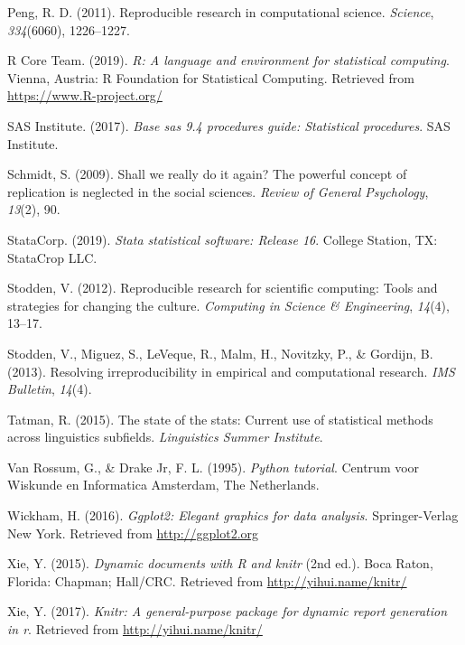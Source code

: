\documentclass[
  english,
  ,man]{apa6}
\begin{document}
\leavevmode\hypertarget{ref-peng2011}{}%
Peng, R. D. (2011). Reproducible research in computational science. \emph{Science}, \emph{334}(6060), 1226--1227.

\leavevmode\hypertarget{ref-rpro}{}%
R Core Team. (2019). \emph{R: A language and environment for statistical computing}. Vienna, Austria: R Foundation for Statistical Computing. Retrieved from \url{https://www.R-project.org/}

\leavevmode\hypertarget{ref-sas2017base}{}%
SAS Institute. (2017). \emph{Base sas 9.4 procedures guide: Statistical procedures}. SAS Institute.

\leavevmode\hypertarget{ref-schmidt2009}{}%
Schmidt, S. (2009). Shall we really do it again? The powerful concept of replication is neglected in the social sciences. \emph{Review of General Psychology}, \emph{13}(2), 90.

\leavevmode\hypertarget{ref-stata}{}%
StataCorp. (2019). \emph{Stata statistical software: Release 16}. College Station, TX: StataCrop LLC.

\leavevmode\hypertarget{ref-stodden2012}{}%
Stodden, V. (2012). Reproducible research for scientific computing: Tools and strategies for changing the culture. \emph{Computing in Science \& Engineering}, \emph{14}(4), 13--17.

\leavevmode\hypertarget{ref-stodden2013}{}%
Stodden, V., Miguez, S., LeVeque, R., Malm, H., Novitzky, P., \& Gordijn, B. (2013). Resolving irreproducibility in empirical and computational research. \emph{IMS Bulletin}, \emph{14}(4).

\leavevmode\hypertarget{ref-tatman2015}{}%
Tatman, R. (2015). The state of the stats: Current use of statistical methods across linguistics subfields. \emph{Linguistics Summer Institute}.

\leavevmode\hypertarget{ref-van1995python}{}%
Van Rossum, G., \& Drake Jr, F. L. (1995). \emph{Python tutorial}. Centrum voor Wiskunde en Informatica Amsterdam, The Netherlands.

\leavevmode\hypertarget{ref-ggplot2}{}%
Wickham, H. (2016). \emph{Ggplot2: Elegant graphics for data analysis}. Springer-Verlag New York. Retrieved from \url{http://ggplot2.org}

\leavevmode\hypertarget{ref-knitr}{}%
Xie, Y. (2015). \emph{Dynamic documents with R and knitr} (2nd ed.). Boca Raton, Florida: Chapman; Hall/CRC. Retrieved from \url{http://yihui.name/knitr/}

\leavevmode\hypertarget{ref-knitrmanual}{}%
Xie, Y. (2017). \emph{Knitr: A general-purpose package for dynamic report generation in r}. Retrieved from \url{http://yihui.name/knitr/}
\end{document}
